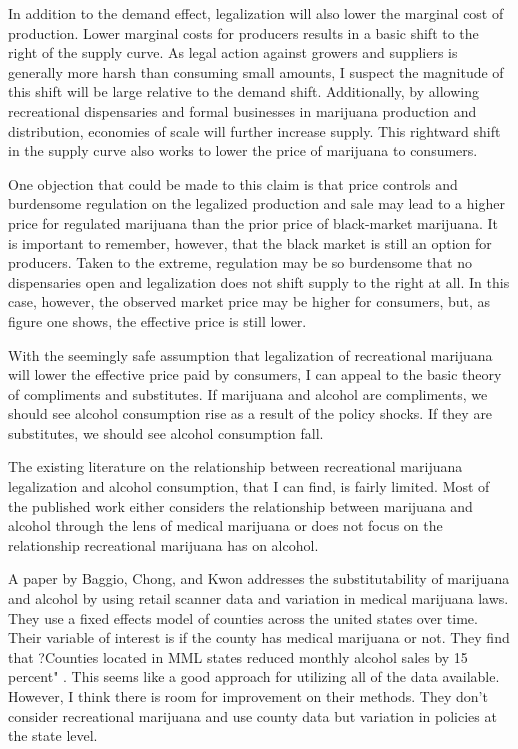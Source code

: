 \documentclass[11pt]{article}
\begin{document}
In addition to the demand effect, legalization will also lower the marginal cost of production. Lower marginal costs for producers results in a basic shift to the right of the supply curve. As legal action against growers and suppliers is generally more harsh than consuming small amounts, I suspect the magnitude of this shift will be large relative to the demand shift. Additionally, by allowing recreational dispensaries and formal businesses in marijuana production and distribution, economies of scale will further increase supply. This rightward shift in the supply curve also works to lower the price of marijuana to consumers. \par

One objection that could be made to this claim is that price controls and burdensome regulation on the legalized production and sale may lead to a higher price for regulated marijuana than the prior price of black-market marijuana. It is important to remember, however, that the black market is still an option for producers. Taken to the extreme, regulation may be so burdensome that no dispensaries open and legalization does not shift supply to the right at all. In this case, however, the observed market price may be higher for consumers, but, as figure one shows, the effective price is still lower. \par

With the seemingly safe assumption that legalization of recreational marijuana will lower the effective price paid by consumers, I can appeal to the basic theory of compliments and substitutes. If marijuana and alcohol are compliments, we should see alcohol consumption rise as a result of the policy shocks. If they are substitutes, we should see alcohol consumption fall.\par

The existing literature on the relationship between recreational marijuana legalization and alcohol consumption, that I can find, is fairly limited. Most of the published work either considers the relationship between marijuana and alcohol through the lens of medical marijuana or does not focus on the relationship recreational marijuana has on alcohol.\par 

A paper by Baggio, Chong, and Kwon addresses the substitutability of marijuana and alcohol by using retail scanner data and variation in medical marijuana laws. They use a fixed effects model of counties across the united states over time. Their variable of interest is if the county has medical marijuana or not. They find that ?Counties located in MML states reduced monthly alcohol sales by 15 percent" \cite{baggio_chong_kwon_2018}. This seems like a good approach for utilizing all of the data available. However, I think there is room for improvement on their methods. They don't consider recreational marijuana and use county data but variation in policies at the state level.  \par
\end{document}
